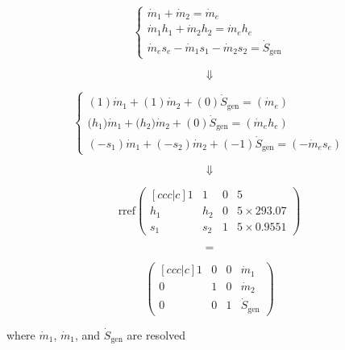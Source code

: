 \makeatletter
\renewcommand*\env@matrix[1][*\c@MaxMatrixCols c]{%
  \hskip -\arraycolsep
  \let\@ifnextchar\new@ifnextchar
  \array{#1}}
\makeatother

$$\begin{cases}
    \dot{m}_1 + \dot{m}_2 = \dot{m}_e \\
    \dot{m}_1 h_1 + \dot{m}_2 h_2 = \dot{m}_e h_e \\
    \dot{m}_e s_e - \dot{m}_1 s_1 - \dot{m}_2 s_2 = \dot{S}_{\text{gen}}
\end{cases}$$


$$\Downarrow$$


$$\begin{cases}
    ({1})\dot{m}_1 + ({1})\dot{m}_2 + ({0})\dot{S}_{\text{gen}}
    = ({\dot{m}_e}) \\
    ({h_1)} \dot{m}_1  + ({h_2)} \dot{m}_2 + (0) \dot{S}_{\text{gen}} 
    = ({\dot{m}_e h_e}) \\
    ({-s_1})\dot{m}_1 + ({-s_2})\dot{m}_2 + ({-1})\dot{S}_{\text{gen}}
    = ({-\dot{m}_e s_e})
\end{cases}$$


$$\Downarrow$$


$$ \text{rref}\left( \begin{matrix}[ccc|c]
    1 & 1 & 0 & 5 \\
    h_1 & h_2 & 0 & 5 \times 293.07 \\
    s_1 & s_2 & 1 & 5 \times 0.9551
\end{matrix} \right)$$


$$=$$


$$\left( \begin{matrix}[ccc|c]
    1 & 0 & 0 & \dot{m}_1 \\
    0 & 1 & 0 & \dot{m}_2 \\
    0 & 0 & 1 & \dot{S}_{\text{gen}}
\end{matrix} \right)$$

\begin{center}
    where 
    $\dot{m}_1$, 
    $\dot{m}_1$, 
    and $\dot{S}_{\text{gen}}$
    are resolved
\end{center}